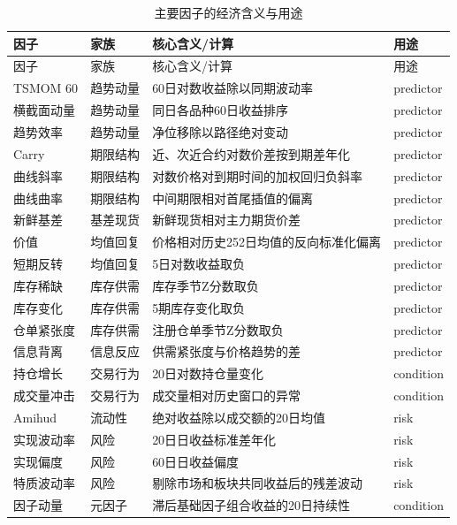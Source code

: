 \documentclass[UTF8,zihao=-4,fontset=ubuntu]{ctexart}
\begin{document}
\footnotesize
\setlength{\tabcolsep}{1.5pt}
\begin{longtable}{L{2.4cm}L{2.0cm}L{6.2cm}L{1.6cm}}
\caption{主要因子的经济含义与用途}\label{tab:factorappendix}\\
\toprule
因子 & 家族 & 核心含义/计算 & 用途 \\
\midrule
\endfirsthead
\toprule
因子 & 家族 & 核心含义/计算 & 用途 \\
\midrule
\endhead
TSMOM 60 & 趋势动量 & 60日对数收益除以同期波动率 & predictor \\
横截面动量 & 趋势动量 & 同日各品种60日收益排序 & predictor \\
趋势效率 & 趋势动量 & 净位移除以路径绝对变动 & predictor \\
Carry & 期限结构 & 近、次近合约对数价差按到期差年化 & predictor \\
曲线斜率 & 期限结构 & 对数价格对到期时间的加权回归负斜率 & predictor \\
曲线曲率 & 期限结构 & 中间期限相对首尾插值的偏离 & predictor \\
新鲜基差 & 基差现货 & 新鲜现货相对主力期货价差 & predictor \\
价值 & 均值回复 & 价格相对历史252日均值的反向标准化偏离 & predictor \\
短期反转 & 均值回复 & 5日对数收益取负 & predictor \\
库存稀缺 & 库存供需 & 库存季节Z分数取负 & predictor \\
库存变化 & 库存供需 & 5期库存变化取负 & predictor \\
仓单紧张度 & 库存供需 & 注册仓单季节Z分数取负 & predictor \\
信息背离 & 信息反应 & 供需紧张度与价格趋势的差 & predictor \\
持仓增长 & 交易行为 & 20日对数持仓量变化 & condition \\
成交量冲击 & 交易行为 & 成交量相对历史窗口的异常 & condition \\
Amihud & 流动性 & 绝对收益除以成交额的20日均值 & risk \\
实现波动率 & 风险 & 20日日收益标准差年化 & risk \\
实现偏度 & 风险 & 60日日收益偏度 & risk \\
特质波动率 & 风险 & 剔除市场和板块共同收益后的残差波动 & risk \\
因子动量 & 元因子 & 滞后基础因子组合收益的20日持续性 & condition \\
\bottomrule
\end{longtable}
\normalsize
\setlength{\tabcolsep}{6pt}
\end{document}
